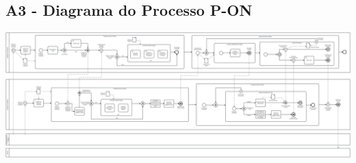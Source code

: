 \documentclass{article}
\begin{document}
\begin{landscape}
	\section*{A3 - Diagrama do Processo P-ON}
	\vspace*{\fill}
	\begin{center}
		\includegraphics[width=1.5\textheight,height=\textwidth,keepaspectratio]{A3-1}
	\end{center}
	\vspace*{\fill}
\end{landscape}
\end{document}
